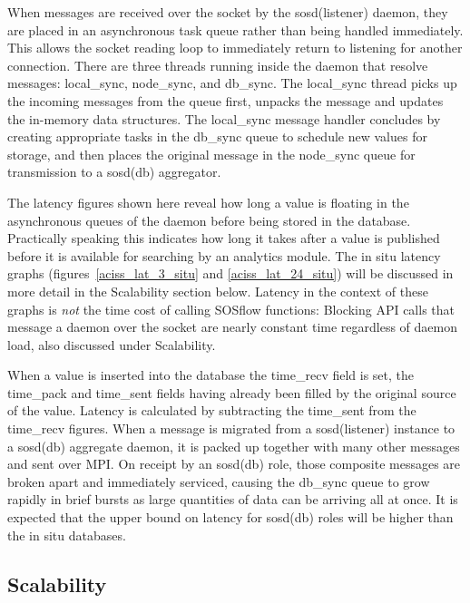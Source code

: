 When messages are received over the socket by the sosd(listener)
daemon, they are placed in an asynchronous task queue rather than
being handled immediately.
%
This allows the socket reading loop to immediately return to listening
for another connection.
%
There are three threads running inside the daemon that resolve
messages: local\_sync, node\_sync, and db\_sync.
%
The local\_sync thread picks up the incoming messages from the queue
first, unpacks the message and updates the in-memory data
structures.
%
The local\_sync message handler concludes by creating appropriate
tasks in the db\_sync queue to schedule new values for storage, and
then places the original message in the node\_sync queue for
transmission to a sosd(db) aggregator.

The latency figures shown here reveal how long a value is floating in
the asynchronous queues of the daemon before being stored in the
database.
%
Practically speaking this indicates how long it takes after a value is
published before it is available for searching by an analytics module.
%
The in situ latency graphs (figures~\ref{aciss_lat_3_situ} and
\ref{aciss_lat_24_situ}) will be discussed in more detail in the
Scalability section below.
%
Latency in the context of these graphs is \textit{not} the time cost
of calling SOSflow functions: Blocking API calls that message a daemon
over the socket are nearly constant time regardless of daemon load,
also discussed under Scalability.

When a value is inserted into the database the time\_recv field is set,
the time\_pack and time\_sent fields having already been filled by the
original source of the value.
%
Latency is calculated by subtracting the time\_sent from the
time\_recv figures.
%
When a message is migrated from a sosd(listener) instance to a
sosd(db) aggregate daemon, it is packed up together with many other
messages and sent over MPI.
%
On receipt by an sosd(db) role, those composite messages are broken
apart and immediately serviced, causing the db\_sync queue to grow
rapidly in brief bursts as large quantities of data can be arriving
all at once.
%
It is expected that the upper bound on latency for sosd(db) roles will
be higher than the in situ databases.



\subsection{Scalability}

